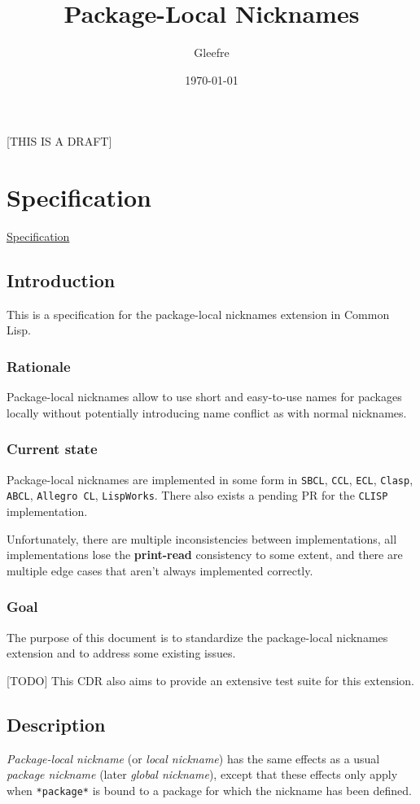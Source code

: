 \documentclass[11pt]{article}
\author{Gleefre}
\date{\today}
\title{Package-Local Nicknames}
\begin{document}
\maketitle
\tableofcontents

[THIS IS A DRAFT]

\section{Specification}
\label{sec:org4acebec}
\href{./spec.org}{Specification}

\subsection{Introduction}
\label{sec:org7514393}
This is a specification for the package-local nicknames extension in Common Lisp.
\subsubsection{Rationale}
\label{sec:orgf1bcc04}
Package-local nicknames allow to use short and easy-to-use names for packages
locally without potentially introducing name conflict as with normal nicknames.
\subsubsection{Current state}
\label{sec:org9b7facb}
Package-local nicknames are implemented in some form in \texttt{SBCL}, \texttt{CCL}, \texttt{ECL},
\texttt{Clasp}, \texttt{ABCL}, \texttt{Allegro CL}, \texttt{LispWorks}. There also exists a pending PR for the
\texttt{CLISP} implementation.

Unfortunately, there are multiple inconsistencies between implementations, all
implementations lose the \textbf{print-read} consistency to some extent, and there are
multiple edge cases that aren't always implemented correctly.
\subsubsection{Goal}
\label{sec:org9b12017}
The purpose of this document is to standardize the package-local nicknames
extension and to address some existing issues.

[TODO] This CDR also aims to provide an extensive test suite for this extension.
\subsection{Description}
\label{sec:orgdacb8be}
\emph{Package-local nickname} (or \emph{local nickname}) has the same effects as a usual
\emph{package nickname} (later \emph{global nickname}), except that these effects only apply
when \texttt{*package*} is bound to a package for which the nickname has been defined.
\end{document}
